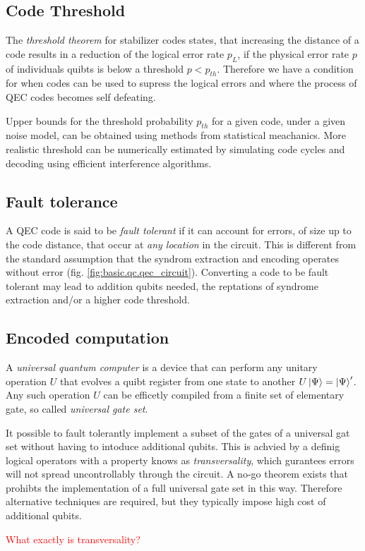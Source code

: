 \subsection{Code Threshold}
The \textit{threshold theorem} for stabilizer codes states,
that increasing the distance of a code results in a reduction of the logical error rate $p_L$,
if the physical error rate $p$ of individuals quibts is below a threshold $p<p_{th}$.
Therefore we have a condition for when codes can be used to supress the logical errors 
and where the process of QEC codes becomes self defeating. \cite{QECintro}

Upper bounds for the threshold probability $p_{th}$ for a given code, under a given noise model, 
can be obtained using methods from statistical meachanics.
More realistic threshold can be numerically estimated by simulating code cycles 
and decoding using efficient interference algorithms. \cite{QECintro}


\subsection{Fault tolerance}
A QEC code is said to be \textit{fault tolerant} 
if it can account for errors, of size up to the code distance, 
that occur at \textit{any location} in the circuit.
This is different from the standard assumption that the syndrom extraction and encoding operates without error
(fig. \ref{fig:basic.qc.qec_circuit}).
Converting a code to be fault tolerant may lead to addition qubits needed, 
the reptations of syndrome extraction and/or a higher code threshold. \cite{QECintro}


\subsection{Encoded computation}
A \textit{universal quantum computer} is a device that can perform any unitary operation $U$ 
that evolves a quibt register from one state to another $U\ket{\Psi} = \ket{\Psi}'$.
Any such operation $U$ can be efficetly compiled from a finite set of elementary gate, 
so called \textit{universal gate set}. \cite{QECintro}

It possible to fault tolerantly implement a subset of the gates of a universal gat set 
without having to intoduce additional qubits. 
This is achvied by a definig logical operators with a property knows as \textit{transversality}, 
which gurantees errors will not spread uncontrollably through the circuit.
A no-go theorem exists that prohibts the implementation of a full universal gate set in this way. 
Therefore alternative techniques are required, but they typically impose high cost of additional qubits. \cite{QECintro}

\textcolor{red}{What exactly is transversality?}


